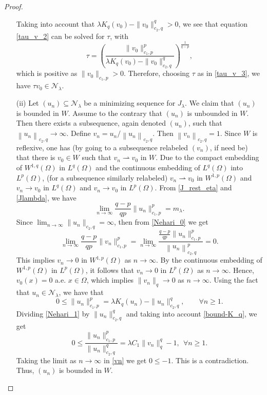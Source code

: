 \documentclass[10pt,a4paper]{amsart}
\begin{document}
\begin{proof}
\begin{itemize}
Taking into account that $\lambda K_q(v_{0})-\|v_0\|_{c_2,q}^q>0$, we see that equation \eqref{tau_v_2} can be solved for $\tau$, with 
\begin{equation}\label{tau_v_3}
\tau=\left(\frac{\|v_0\|_{c_1,p}^p}{\lambda K_q(v_{0})-\|v_0\|_{c_2,q}^q}\right)^{\frac{1}{q-p}}
,
\end{equation}
which is positive as $\|v_{0}\|_{c_1,p}>0$. Therefore, choosing  $\tau$ as in \eqref{tau_v_3}, we have $\tau v_{0} \in \mathcal{N}_{\lambda}$.
\item[(ii)]  Let 
$\left(u_{n}\right) \subseteq \mathcal{N}_{\lambda}$ be a minimizing sequence for $J_{\lambda}$. We claim that $(u_{n}) $  is bounded in $W$. Assume to the contrary that $\left(u_{n}\right)$ is unbounded in $W$. Then there exists a subsequence, again denoted $\left(u_{n}\right)$, such that $\left\|u_{n}\right\|_{c_2,q} \rightarrow \infty$. 
Define $v_{n}=u_{n} /\left\|u_{n}\right\|_{c_2,q}.$ Then $\left\|v_{n}\right\|_{c_2,q}=1. $ Since $W$ is reflexive,  one has (by going to a subsequence relabeled $(v_n)$, if need be) that there is $v_{0} \in W$ such that $v_{n} \rightharpoonup v_{0}$ in $W$. Due to the compact embedding of $W^{1,q}(\Omega)$ in $ L^q(\Omega)$ and the continuous embedding of  $L^q(\Omega)$ into $L^p(\Omega)$, (for a subsequence similarly relabeled) $v_{n} \rightharpoonup v_{0}$ in $W^{1, p}(\Omega)$ and  $v_{n} \rightarrow v_{0}$ in $L^{q}(\Omega)$  and $v_{n} \rightarrow v_{0}$ in $L^{p}(\Omega)$.  From \eqref{J_rest_eta} and \eqref{Jlambda}, we have
\begin{equation}\label{Nehari_0}
    \lim_{n\to \infty}\frac{q-p}{q p} \|u_n\|_{c_1,p}^p= m_{\lambda}.
\end{equation}
Since $\displaystyle \lim_{n\to \infty} \|u_n\|_{c_2, q}=\infty$, then from \eqref{Nehari_0} we get 
\begin{equation*}
\lim_{n\to \infty}\frac{q-p}{q p} \|v_n\|_{c_1,p}^p=\lim_{n\to \infty}\frac{\frac{q-p}{q p} \|u_n\|_{c_1,p}^p} {\left\|u_{n}\right\|_{c_2,q}^p} = 0.
\end{equation*}
This implies $ v_n\to 0$ in $W^{1,p}(\Omega)$ as $n\to \infty$. By the continuous embedding of $W^{1,p}(\Omega)$ in $L^p(\Omega)$, it follows that $v_n \to 0$ in $L^p(\Omega)$ as $n\to \infty$. Hence, $v_0(x)=0$ a.e. $x\in \Omega$, which implies $\|v_{n}\|_{q}\to 0$  as $n\to \infty$.
Using the fact that  $u_n \in \mathcal{N}_\lambda$, we have that  
\begin{equation}\label{Nehari_1}0 \leqslant \|u_n \|_{c_1,p}^p=\lambda K_q(u_{n})-\|u_n \|_{c_2,q}^q , \qquad \forall n  \geqslant 1.  \end{equation}
Dividing \eqref{Nehari_1} by $\|u_n\|_{c_2,q}^q$ and taking into account  \eqref{bound-K_q}, we get
\begin{equation}\label{vn}
0 \leqslant \frac{\|u_n \|_{c_1,p}^p}{\|u_n\|_{c_2,q}^q}=\lambda C_1 \|v_{n}\|_{q}^{q}-1 ,\ \ \forall n \geqslant 1 .
\end{equation}
Taking the limit as  $n\to\infty$ in \eqref{vn}  we get $0\leqslant -1.$ This is a contradiction. Thus, $\left(u_{n}\right)$ is bounded in $W$.


\end{itemize}
\end{proof}
\end{document}
